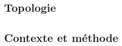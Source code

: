 \documentclass[12pt,a4paper]{article}
\begin{document}



\newpage
\begin{center}  
\section*{Topologie} 
\end{center}


\subsection*{Contexte et méthode}
\end{document}
